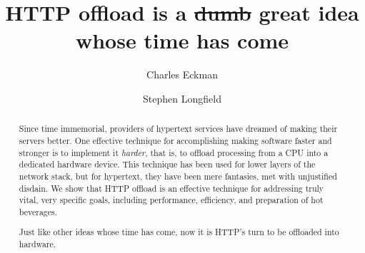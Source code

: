 \documentclass[sigconf,authorversion,nonacm]{acmart}
\begin{document}
\title{HTTP offload is a \sout{dumb} great idea whose time has come}

\author{Charles Eckman}
\author{Stephen Longfield}

\renewcommand{\shortauthors}{Eckman et al.}

\begin{abstract}





Since time immemorial, providers of hypertext services have dreamed of making their servers better.
One effective technique for accomplishing making software faster and stronger is to implement it \textit{harder},\cite{murphy2022harder}
that is, to offload processing from a CPU into a dedicated hardware device.
This technique has been used for lower layers of the network stack, but for hypertext,
they have been mere fantasies, met with unjustified disdain.
We show that HTTP offload is an effective technique for addressing truly vital, very specific goals,
including performance, efficiency, and preparation of hot beverages.

Just like other ideas whose time has come\cite{mogul2003tcp}, now it is HTTP's turn to be offloaded into hardware.

\end{abstract}
\end{document}
